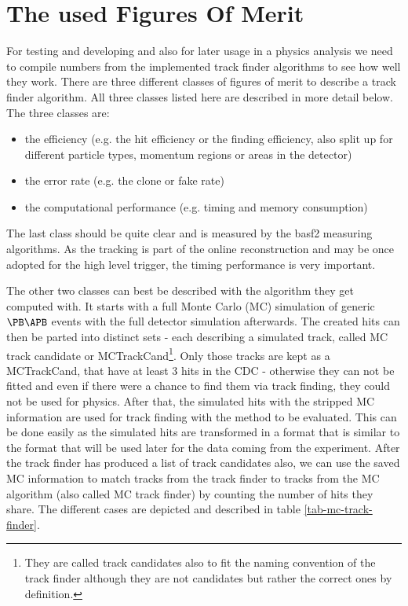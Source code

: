 \section{The used Figures Of Merit}

For testing and developing and also for later usage in a physics analysis we need to compile numbers from the implemented track finder algorithms to see how well they work. There are three different classes of figures of merit to describe a track finder algorithm. All three classes listed here are described in more detail below. The three classes are:
\begin{itemize}
  \item the efficiency (e.g. the hit efficiency or the finding efficiency, also split up for different particle types, momentum regions or areas in the detector)
  \item the error rate (e.g. the clone or fake rate)
  \item the computational performance (e.g. timing and memory consumption)
\end{itemize}

The last class should be quite clear and is measured by the basf2 measuring algorithms. As the tracking is part of the online reconstruction and may be once adopted for the high level trigger, the timing performance is very important. 

The other two classes can best be described with the algorithm they get computed with. It starts with a full Monte Carlo (MC) simulation of generic $\PB\APB$ events with the full detector simulation afterwards. The created hits can then be parted into distinct sets - each describing a simulated track, called MC track candidate or MCTrackCand\footnote{They are called track candidates also to fit the naming convention of the track finder although they are not candidates but rather the correct ones by definition.}. Only those tracks are kept as a MCTrackCand, that have at least 3 hits in the CDC - otherwise they can not be fitted and even if there were a chance to find them via track finding, they could not be used for physics. After that, the simulated hits with the stripped MC information are used for track finding with the method to be evaluated. This can be done easily as the simulated hits are transformed in a format that is similar to the format that will be used later for the data coming from the experiment. After the track finder has produced a list of track candidates also, we can use the saved MC information to match tracks from the track finder to tracks from the MC algorithm (also called MC track finder) by counting the number of hits they share. The different cases are depicted and described in table \ref{tab-mc-track-finder}.

